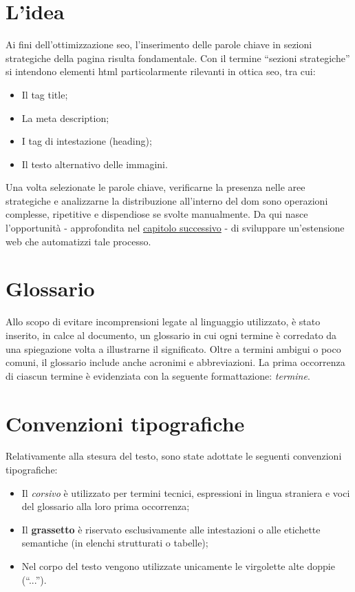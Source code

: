 \section{L'idea}

Ai fini dell’ottimizzazione \gls{seo}, l’inserimento delle parole chiave in sezioni strategiche della pagina risulta fondamentale. Con il termine “sezioni strategiche” si intendono elementi \gls{html} particolarmente rilevanti in ottica \gls{seo}, tra cui:
\begin{itemize}
    \item Il tag title;
    \item La meta description;
    \item I tag di intestazione (heading);
    \item Il testo alternativo delle immagini.
\end{itemize}

\vspace{5pt}
\noindent Una volta selezionate le parole chiave, verificarne la presenza nelle aree strategiche e analizzarne la distribuzione all’interno del \gls{dom} sono operazioni complesse, ripetitive e dispendiose se svolte manualmente. Da qui nasce l’opportunità - approfondita nel \hyperref[cap:descrizione-progetto]{capitolo successivo} - di sviluppare un’estensione web che automatizzi tale processo.

\section{Glossario}

Allo scopo di evitare incomprensioni legate al linguaggio utilizzato, è stato inserito, in calce al documento, un glossario in cui ogni termine è corredato da una spiegazione volta a illustrarne il significato. Oltre a termini ambigui o poco comuni, il glossario include anche acronimi e abbreviazioni. La prima occorrenza di ciascun termine è evidenziata con la seguente formattazione: \textit{termine}\glsfirstoccur.

\section{Convenzioni tipografiche}

Relativamente alla stesura del testo, sono state adottate le seguenti convenzioni tipografiche:
\begin{itemize}
	\item Il \textit{corsivo} è utilizzato per termini tecnici, espressioni in lingua straniera e voci del glossario alla loro prima occorrenza;
	\item Il \textbf{grassetto} è riservato esclusivamente alle intestazioni o alle etichette semantiche (in elenchi strutturati o tabelle);
	\item Nel corpo del testo vengono utilizzate unicamente le virgolette alte doppie (“...”).
\end{itemize}
